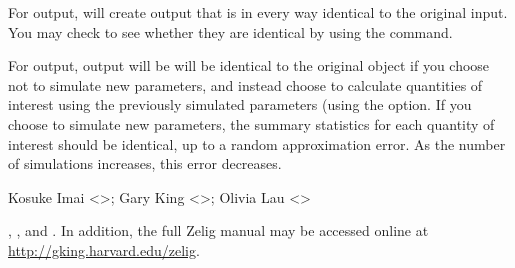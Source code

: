 \begin{Value}
For  output,  will create output that is in
every way identical to the original input.  You may check to see
whether they are identical by using the  command.  

For  output,  output will be will be
identical to the original object if you choose not to simulate new
parameters, and instead choose to calculate quantities of interest
using the previously simulated parameters (using the 
option.  If you choose to simulate new parameters, the summary
statistics for each quantity of interest should be identical, up to a
random approximation error.  As the number of simulations increases,
this error decreases.
\end{Value}
\begin{Author}\relax
Kosuke Imai <>; Gary King
<>; Olivia Lau <>
\end{Author}
\begin{SeeAlso}\relax
{}, , and
.  In addition, the full Zelig manual may be
accessed online at \url{http://gking.harvard.edu/zelig}.
\end{SeeAlso}
\begin{Examples}
\end{Examples}


